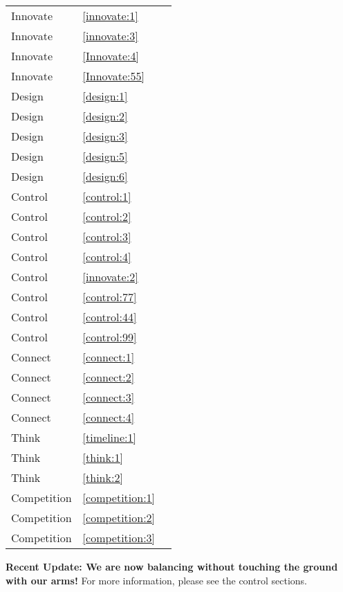 {{\begin{tabular}{lp{}r}
            Innovate & \ref{innovate:1} & \pageref{innovate:1}\\
            Innovate & \ref{innovate:3} & \pageref{innovate:3}\\
            Innovate & \ref{Innovate:4} & \pageref{Innovate:4}\\
            Innovate & \ref{Innovate:55} & \pageref{Innovate:55}\\
            Design & \ref{design:1} & \pageref{design:1}\\
            Design & \ref{design:2} & \pageref{design:2}\\
            Design & \ref{design:3} & \pageref{design:3}\\
            Design & \ref{design:5} & \pageref{design:5}\\
            Design & \ref{design:6} & \pageref{design:6}\\
            Control & \ref{control:1} & \pageref{control:1}\\
            Control & \ref{control:2} & \pageref{control:2}\\
            Control & \ref{control:3} & \pageref{control:3}\\
            Control & \ref{control:4} & \pageref{control:4}\\
            Control & \ref{innovate:2} & \pageref{innovate:2}\\
            Control & \ref{control:77} & \pageref{control:77}\\
            Control & \ref{control:44} & \pageref{control:44}\\
            Control & \ref{control:99} & \pageref{control:99}\\
            Connect & \ref{connect:1} & \pageref{connect:1}\\
            Connect & \ref{connect:2} & \pageref{connect:2}\\
            Connect & \ref{connect:3} & \pageref{connect:3}\\
            Connect & \ref{connect:4} & \pageref{connect:4}\\
            Think & \ref{timeline:1} & \pageref{timeline:1}\\
            Think & \ref{think:1} & \pageref{think:1}\\
            Think & \ref{think:2} & \pageref{think:2}\\
            Competition & \ref{competition:1} & \pageref{competition:1}\\
            Competition & \ref{competition:2} & \pageref{competition:2}\\
            Competition & \ref{competition:3} & \pageref{competition:3}\\
	
           
		\bottomrule
	\end{tabular}
}
    \vspace{.5cm}
\newline \textbf{Recent Update: We are now balancing without touching the ground with our arms!} For more information, please see the control sections.
}

